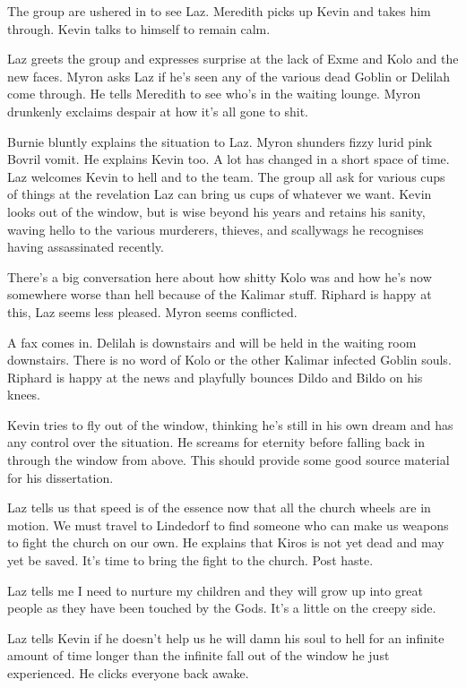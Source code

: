 The group are ushered in to see Laz. Meredith picks up Kevin and takes him through. Kevin talks to himself to remain calm.\medskip

Laz greets the group and expresses surprise at the lack of Exme and Kolo and the new faces. Myron asks Laz if he’s seen any of the various dead Goblin or Delilah come through. He tells Meredith to see who’s in the waiting lounge. Myron drunkenly exclaims despair at how it’s all gone to shit.\medskip

Burnie bluntly explains the situation to Laz. Myron shunders fizzy lurid pink Bovril vomit. He explains Kevin too. A lot has changed in a short space of time. Laz welcomes Kevin to hell and to the team. The group all ask for various cups of things at the revelation Laz can bring us cups of whatever we want. Kevin looks out of the window, but is wise beyond his years and retains his sanity, waving hello to the various murderers, thieves, and scallywags he recognises having assassinated recently.\medskip

There’s a big conversation here about how shitty Kolo was and how he’s now somewhere worse than hell because of the Kalimar stuff. Riphard is happy at this, Laz seems less pleased. Myron seems conflicted.\medskip

A fax comes in. Delilah is downstairs and will be held in the waiting room downstairs. There is no word of Kolo or the other Kalimar infected Goblin souls. Riphard is happy at the news and playfully bounces Dildo and Bildo on his knees.\medskip

Kevin tries to fly out of the window, thinking he’s still in his own dream and has any control over the situation. He screams for eternity before falling back in through the window from above. This should provide some good source material for his dissertation.\medskip

Laz tells us that speed is of the essence now that all the church wheels are in motion. We must travel to Lindedorf to find someone who can make us weapons to fight the church on our own. He explains that Kiros is not yet dead and may yet be saved. It’s time to bring the fight to the church. Post haste.\medskip

Laz tells me I need to nurture my children and they will grow up into great people as they have been touched by the Gods. It’s a little on the creepy side.\medskip

Laz tells Kevin if he doesn’t help us he will damn his soul to hell for an infinite amount of time longer than the infinite fall out of the window he just experienced. He clicks everyone back awake.\medskip

